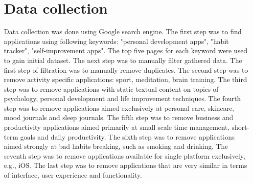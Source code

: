 
\section{Data collection}\label{sec:data-collection}

Data collection was done using Google search engine.
The first step was to find applications using following keywords: "personal development apps", "habit tracker", "self-improvement apps".
The top five pages for each keyword were used to gain initial dataset.
The next step was to manually filter gathered data.
The first step of filtration was to manually remove duplicates.
The second step was to remove activity specific applications: sport, meditation, brain training.
The third step was to remove applications with static textual content on topics of psychology, personal development and life improvement techniques.
The fourth step was to remove applications aimed exclusively at personal care, skincare, mood journals and sleep journals.
The fifth step was to remove business and productivity applications aimed primarily at small scale time management, short-term goals and daily productivity.
The sixth step was to remove applications aimed strongly at bad habits breaking, such as smoking and drinking.
The seventh step was to remove applications available for single platform exclusively, e.g., iOS\@.
The last step was to remove applications that are very similar in terms of interface, user experience and functionality.

